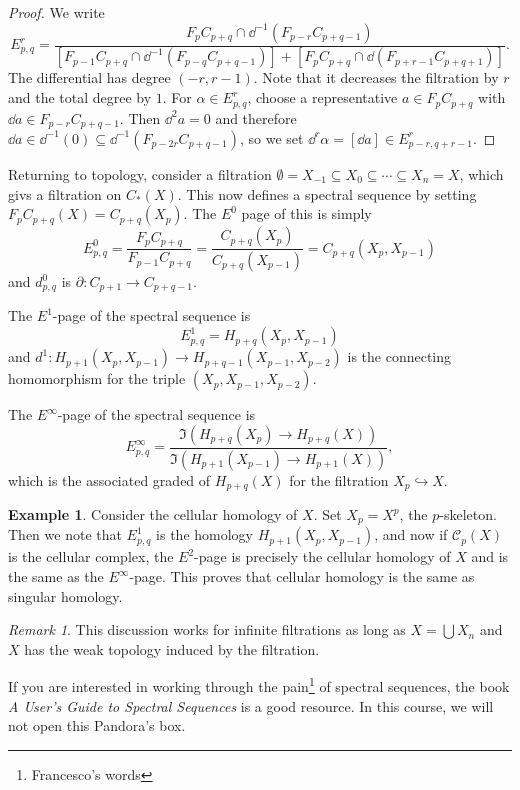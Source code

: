 \documentclass[leqno, openany]{memoir}
\theoremstyle{definition}
\newtheorem{exm}[thm]{Example}
\theoremstyle{remark}
\newtheorem{rmk}[thm]{Remark}
\theoremstyle{plain}
\theoremstyle{definition}
\theoremstyle{remark}
\newcommand{\mc}[1]{\mathcal{#1}}
\begin{document}
\begin{proof}
    We write
    \[ E_{p,q}^r = \frac{F_p C_{p+q} \cap \dd^{-1} (F_{p-r} C_{p+q-1})}{[F_{p-1} C_{p+q} \cap \dd^{-1}(F_{p-q}C_{p+q-1})] + [F_p C_{p+q} \cap \dd(F_{p+r-1} C_{p+q+1})]}. \]
    The differential has degree $(-r, r-1)$. Note that it decreases the filtration by $r$ and the total degree by $1$. For $\alpha \in E_{p,q}^r$, choose a representative $a \in F_p C_{p+q}$ with $\dd{a} \in F_{p-r} C_{p+q-1}$. Then $\dd^2 a = 0$ and therefore $\dd{a} \in \dd^{-1}(0) \subseteq \dd^{-1}(F_{p-2r} C_{p+q-1})$, so we set $\dd^r \alpha = [\dd{a}] \in E_{p-r, q+r-1}^r$.
\end{proof}

Returning to topology, consider a filtration $\emptyset = X_{-1} \subseteq X_0 \subseteq \cdots \subseteq X_n = X$, which givs a filtration on $C_*(X)$. This now defines a spectral sequence by setting $F_p C_{p+q}(X) = C_{p+q}(X_p)$. The $E^0$ page of this is simply
\[ E_{p,q}^0 = \frac{F_p C_{p+q}}{F_{p-1} C_{p+q}} = \frac{C_{p+q}(X_p)}{C_{p+q}(X_{p-1})} = C_{p+q}(X_p, X_{p-1}) \]
and $d_{p,q}^0$ is $\partial \colon C_{p+1} \to C_{p+q-1}$.

The $E^1$-page of the spectral sequence is
\[ E^1_{p,q} = H_{p+q}(X_p, X_{p-1})\] 
and $d^1 \colon H_{p+1}(X_p, X_{p-1}) \to H_{p+q-1}(X_{p-1}, X_{p-2})$ is the connecting homomorphism for the triple $(X_p, X_{p-1}, X_{p-2})$. 

The $E^{\infty}$-page of the spectral sequence is
\[ E_{p,q}^{\infty} = \frac{\Im(H_{p+q}(X_p) \to H_{p+q}(X))}{\Im(H_{p+1}(X_{p-1}) \to H_{p+1}(X))}, \]
which is the associated graded of $H_{p+q}(X)$ for the filtration $X_p \hookrightarrow X$.

\begin{exm}
    Consider the cellular homology of $X$. Set $X_p = X^p$, the $p$-skeleton. Then we note that $E_{p,q}^1$ is the homology $H_{p+1}(X_p, X_{p-1})$, and now if $\mc{C}_p(X)$ is the cellular complex, the $E^2$-page is precisely the cellular homology of $X$ and is the same as the $E^{\infty}$-page. This proves that cellular homology is the same as singular homology.
\end{exm}

\begin{rmk}
    This discussion works for infinite filtrations as long as $X = \bigcup X_n$ and $X$ has the weak topology induced by the filtration.
\end{rmk}

If you are interested in working through the pain\footnote{Francesco's words} of spectral sequences, the book \textit{A User's Guide to Spectral Sequences} is a good resource. In this course, we will not open this Pandora's box.
\end{document}
